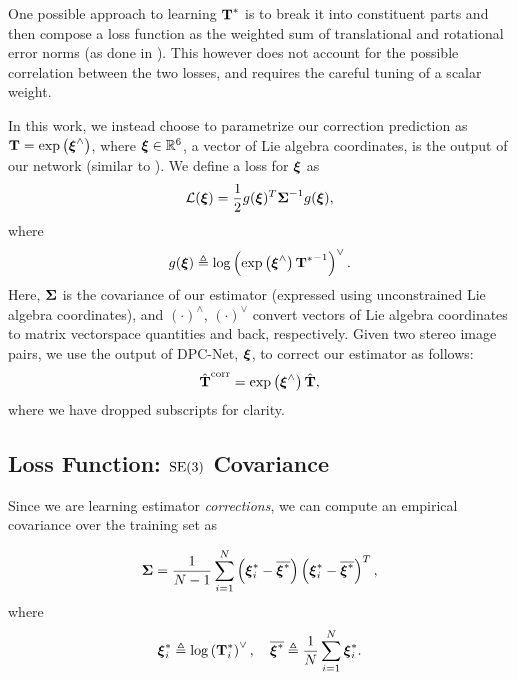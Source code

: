 One possible approach to learning $\boldsymbol{\mathbf{T}}^*$ is to break it into constituent parts and then compose a loss function as the weighted sum of translational and rotational error norms (as done in \cite{Kendall2017-ix, Melekhov2017-dl, Oliveira2017-lt}). This however does not account for the possible correlation between the two losses, and requires the careful tuning of a scalar weight.

In this work, we instead choose to parametrize our correction prediction as $\boldsymbol{\mathbf{T}} = \mathrm{exp}\left({\boldsymbol{\mathbf{\xi}}}^{\wedge}\right)$, where $\boldsymbol{\mathbf{\xi}} \in \mathbb{R}^6$, a vector of Lie algebra coordinates, is the output of our network (similar to \cite{Handa2016-hm}). We define a loss for $\boldsymbol{\mathbf{\xi}}$ as 
\begin{equation}
	\label{eq:se3loss_fn}
\mathcal{L} (\boldsymbol{\mathbf{\xi}}) = \frac{1}{2} g({\boldsymbol{\mathbf{\xi}}})^T {\boldsymbol{\mathbf{\Sigma}}}^{-1} g({\boldsymbol{\mathbf{\xi}}}),
\end{equation} where 
\begin{equation}
	\label{eq:se3logmap_fn}
	g({\boldsymbol{\mathbf{\xi}}}) \triangleq \mathrm{log}\left({\mathrm{exp}\left({\boldsymbol{\mathbf{\xi}}}^{\wedge}\right) {\boldsymbol{\mathbf{T}}^*}^{-1}}\right)^{\vee}.
\end{equation}
Here, $\boldsymbol{\mathbf{\Sigma}}$ is the covariance of our estimator (expressed using unconstrained Lie algebra coordinates), and $(\cdot)^\wedge$, $(\cdot)^\vee$ convert vectors of Lie algebra coordinates to matrix vectorspace quantities and back, respectively.
Given two stereo image pairs, we use the output of DPC-Net, $\boldsymbol{\mathbf{\xi}}$, to correct our estimator as follows:
\begin{align}
	\hat{\boldsymbol{\mathbf{T}}}^{\mathrm{corr}} = \mathrm{exp}\left({\boldsymbol{\mathbf{\xi}}}^{\wedge}\right) \hat{\boldsymbol{\mathbf{T}}},
\end{align}
where we have dropped subscripts for clarity.

\subsection{Loss Function: $\mathrm{SE}(3)$ Covariance}

Since we are learning estimator \textit{corrections}, we can compute an empirical covariance over the training set as

\begin{equation}
\boldsymbol{\mathbf{\Sigma}} = \frac{1}{N-1} \sum_{i=1}^{N} \left( \boldsymbol{\mathbf{\xi}}^*_i -\overline{\boldsymbol{\mathbf{\xi}}^*} \right) \left( \boldsymbol{\mathbf{\xi}}^*_i -\overline{\boldsymbol{\mathbf{\xi}}^*} \right)^T,
\end{equation}
where 
\begin{equation}
	\boldsymbol{\mathbf{\xi}}^*_i \triangleq \mathrm{log}\left({\boldsymbol{\mathbf{T}}^*_i}\right)^{\vee}, \quad \overline{\boldsymbol{\mathbf{\xi}}^*} \triangleq \frac{1}{N} \sum_{i=1}^N \boldsymbol{\mathbf{\xi}}^*_i.
\end{equation}


